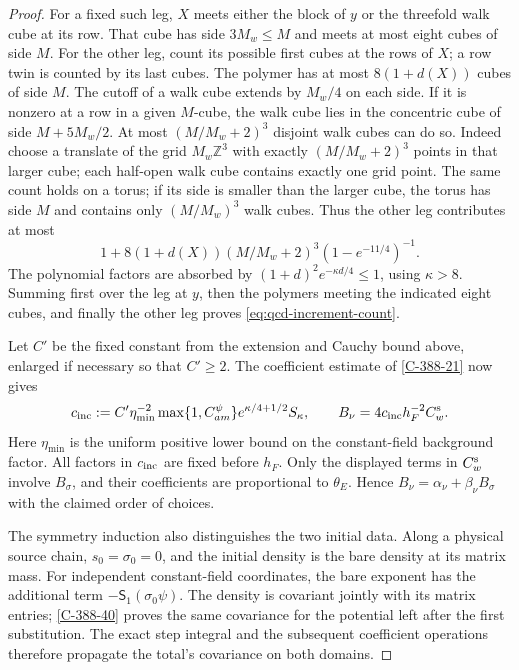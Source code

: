 \documentclass[11pt,letterpaper,reqno]{amsart}
\theoremstyle{definition}
\theoremstyle{remark}
\begin{document}
\begin{proof}
For a fixed such leg, $X$ meets either the block of $y$ or
the threefold walk cube at its row. That cube has side
$3M_w\le M$ and meets at most eight cubes of side $M$.
For the other leg, count its possible first cubes at the
rows of $X$; a row twin is counted by its last cubes.
The polymer has at most $8(1+d(X))$ cubes of side $M$.
The cutoff of a walk cube extends by $M_w/4$ on each side.
If it is nonzero at a row in a given $M$-cube, the walk cube
lies in the concentric cube of side $M+5M_w/2$.
At most $(M/M_w+2)^3$ disjoint walk cubes can do so.
Indeed choose a translate of the grid $M_w\mathbb Z^3$
with exactly $(M/M_w+2)^3$ points in that larger cube;
each half-open walk cube contains exactly one grid point.
The same count holds on a torus; if its side is smaller
than the larger cube, the torus has side $M$ and contains
only $(M/M_w)^3$ walk cubes.
Thus the other leg contributes at most
\[
 1+8(1+d(X))(M/M_w+2)^3(1-e^{-11/4})^{-1}.
\]
The polynomial factors are absorbed by
$(1+d)^2e^{-\kappa d/4}\le1$, using $\kappa>8$.
Summing first over the leg at $y$, then the polymers
meeting the indicated eight cubes, and finally the other
leg proves \eqref{eq:qcd-increment-count}.

Let $C'$ be the fixed constant from the extension and Cauchy
bound above, enlarged if necessary so that $C'\ge2$.
The coefficient estimate of \cref{C-388-21} now gives
\[
 c_{\rm inc}:=C'\eta_{\min}^{-2}
       \max\{1,C^\psi_{am}\}e^{\kappa/4+1/2}S_\kappa,
 \qquad B_\nu=4c_{\rm inc}h_F^{-2}C_w^{\rm s}.
\]
Here $\eta_{\min}$ is the uniform positive lower bound on
the constant-field background factor. All factors in
$c_{\rm inc}$ are fixed before $h_F$. Only the displayed
terms in $C_w^{\rm s}$ involve $B_\sigma$, and their
coefficients are proportional to $\theta_E$.
Hence $B_\nu=\alpha_\nu+\beta_\nu B_\sigma$ with the
claimed order of choices.

The symmetry induction also distinguishes the two initial data.
Along a physical source chain, $s_0=\sigma_0=0$, and the initial
density is the bare density at its matrix mass.  For independent
constant-field coordinates, the bare exponent has the additional
term $-\mathsf S_1(\sigma_0\psi)$.  The density is covariant
jointly with its matrix entries; \cref{C-388-40} proves the same
covariance for the potential left after the first substitution.
The exact step integral and the subsequent coefficient operations
therefore propagate the total's covariance on both domains.
\end{proof}
\end{document}
